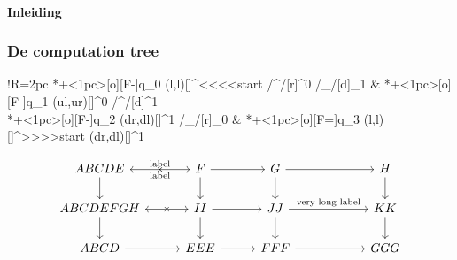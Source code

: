  


\paragraph{Inleiding}






	\subsubsection{De computation tree}

\xymatrix@ur@!R=2pc{%
	*+<1pc>[o][F-]{q_0}  \ar@(l,l)[]^<<<<{start} \ar@/^/[r]^0  \ar@/_/[d]_1 
	& *+<1pc>[o][F-]{q_1} \ar@(ul,ur)[]^{0}  \ar@/^/[d]^1 \\
	*+<1pc>[o][F-]{q_2} \ar@(dr,dl)[]^{1} \ar@/_/[r]_0 
	& *+<1pc>[o][F=]{q_3} \ar@(l,l)[]^>>>>{start}  \ar@(dr,dl)[]^{1} \\
 
 }










\[\begin{tikzcd}[column sep=1cm]
	ABCDE\arrow[r, leftrightarrow, "\times"{anchor=center},"\text{label}","\text{label}"{below}]\arrow[d] & F\arrow[r]\arrow[d] & G\arrow[rr]\arrow[d] && H\arrow[d]\\
	ABCDEFGH\arrow[r, leftrightarrow, "\times"{anchor=center}]\arrow[d] & II\arrow[r]\arrow[d] & JJ\arrow[rr,"\text{very long label}"]\arrow[d] && KK\arrow[d]\\
	ABCD\arrow[r] & EEE\arrow[r] & FFF\arrow[rr] && GGG
\end{tikzcd}\]




